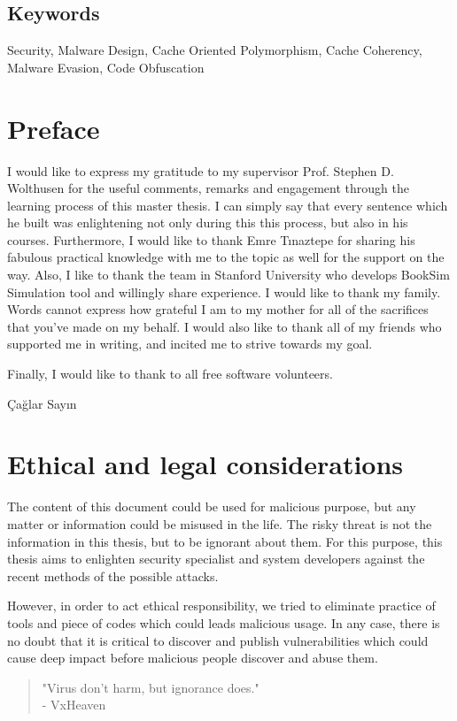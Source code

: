 \documentclass[medieteknikk]{gucmasterthesis}
\begin{document}
\section*{Keywords}
Security, Malware Design, Cache Oriented Polymorphism, Cache Coherency, Malware Evasion, Code Obfuscation

\chapter*{Preface}

I would like to express my gratitude to my supervisor Prof. Stephen D. Wolthusen for the useful comments, remarks and engagement through the learning process of this master thesis. I can simply say that every sentence which he built was enlightening not only during this this process, but also in his courses. Furthermore, I would like to thank Emre Tınaztepe for sharing his fabulous practical knowledge with me to the topic as well for the support on the way. Also, I like to thank the team in Stanford University who develops BookSim Simulation tool and willingly share experience. I would like to thank my family.  Words cannot express how grateful I am to my mother for all of the sacrifices that you've made on my behalf. I would also like to thank all of my friends who supported me in writing, and incited me to strive towards my goal.

Finally, I would like to thank to all free software volunteers. 

\vspace{\baselineskip}
\noindent Çağlar Sayın \gucmasterthesisdate

\chapter*{Ethical and legal considerations}

The content of this document could be used for malicious purpose, but any matter or information could be misused in the life. The risky threat is not the information in this thesis, but to be ignorant about them. For this purpose, this thesis aims to enlighten security specialist and system developers against the recent methods of the possible attacks. 

However, in order to act ethical responsibility, we tried to eliminate practice of tools and piece of codes which could leads malicious usage. In any case, there is no doubt that it is critical to discover and publish vulnerabilities which could cause deep impact before malicious people discover and abuse them.

\begin{quote}

	"Virus don't harm, but ignorance does."\\
	- VxHeaven
\end{quote}

\tableofcontents
\listoffigures
\listoftables









\appendix


\end{document}
